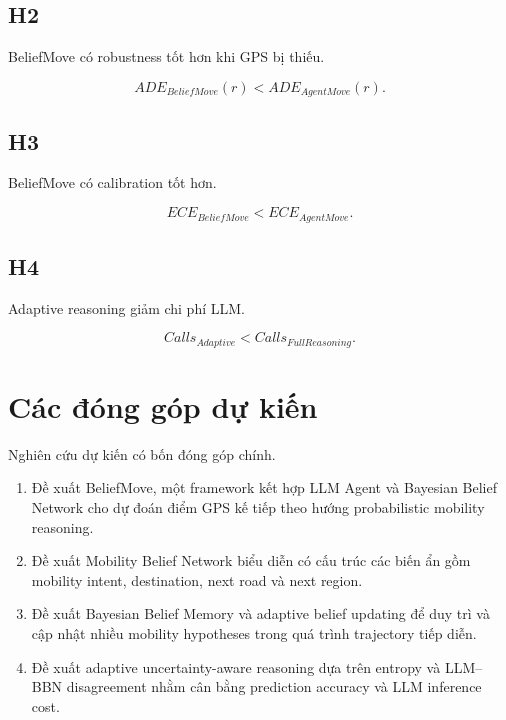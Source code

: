 \documentclass[11pt,a4paper]{article}
\begin{document}
	\subsection{H2}
	
	BeliefMove có robustness tốt hơn khi GPS bị thiếu.
	
	\begin{equation}
		ADE_{BeliefMove}(r)
		<
		ADE_{AgentMove}(r).
	\end{equation}
	
	\subsection{H3}
	
	BeliefMove có calibration tốt hơn.
	
	\begin{equation}
		ECE_{BeliefMove}
		<
		ECE_{AgentMove}.
	\end{equation}
	
	\subsection{H4}
	
	Adaptive reasoning giảm chi phí LLM.
	
	\begin{equation}
		Calls_{Adaptive}
		<
		Calls_{FullReasoning}.
	\end{equation}
	
	\section{Các đóng góp dự kiến}
	
	Nghiên cứu dự kiến có bốn đóng góp chính.
	
	\begin{enumerate}
		
		\item
		Đề xuất BeliefMove, một framework kết hợp LLM Agent và Bayesian Belief
		Network cho dự đoán điểm GPS kế tiếp theo hướng probabilistic mobility
		reasoning.
		
		\item
		Đề xuất Mobility Belief Network biểu diễn có cấu trúc các biến ẩn gồm
		mobility intent, destination, next road và next region.
		
		\item
		Đề xuất Bayesian Belief Memory và adaptive belief updating để duy trì
		và cập nhật nhiều mobility hypotheses trong quá trình trajectory tiếp
		diễn.
		
		\item
		Đề xuất adaptive uncertainty-aware reasoning dựa trên entropy và
		LLM--BBN disagreement nhằm cân bằng prediction accuracy và LLM inference
		cost.
		
	\end{enumerate}
	
\end{document}

